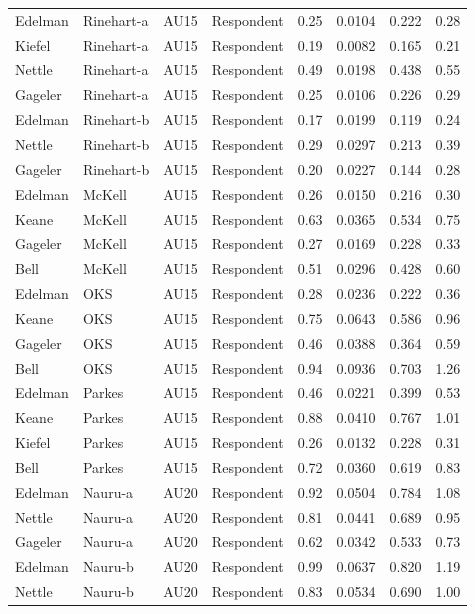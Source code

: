 \documentclass{monashthesis}
\begin{document}
\begin{center}
\begin{longtable}{llllllll}
Edelman & Rinehart-a & AU15 & Respondent & 0.25 & 0.0104 & 0.222 & 0.28 \\
Kiefel & Rinehart-a & AU15 & Respondent & 0.19 & 0.0082 & 0.165 & 0.21 \\
Nettle & Rinehart-a & AU15 & Respondent & 0.49 & 0.0198 & 0.438 & 0.55 \\
Gageler & Rinehart-a & AU15 & Respondent & 0.25 & 0.0106 & 0.226 & 0.29 \\
Edelman & Rinehart-b & AU15 & Respondent & 0.17 & 0.0199 & 0.119 & 0.24 \\
Nettle & Rinehart-b & AU15 & Respondent & 0.29 & 0.0297 & 0.213 & 0.39 \\
Gageler & Rinehart-b & AU15 & Respondent & 0.20 & 0.0227 & 0.144 & 0.28 \\
Edelman & McKell & AU15 & Respondent & 0.26 & 0.0150 & 0.216 & 0.30 \\
Keane & McKell & AU15 & Respondent & 0.63 & 0.0365 & 0.534 & 0.75 \\
Gageler & McKell & AU15 & Respondent & 0.27 & 0.0169 & 0.228 & 0.33 \\
Bell & McKell & AU15 & Respondent & 0.51 & 0.0296 & 0.428 & 0.60 \\
Edelman & OKS & AU15 & Respondent & 0.28 & 0.0236 & 0.222 & 0.36 \\
Keane & OKS & AU15 & Respondent & 0.75 & 0.0643 & 0.586 & 0.96 \\
Gageler & OKS & AU15 & Respondent & 0.46 & 0.0388 & 0.364 & 0.59 \\
Bell & OKS & AU15 & Respondent & 0.94 & 0.0936 & 0.703 & 1.26 \\
Edelman & Parkes & AU15 & Respondent & 0.46 & 0.0221 & 0.399 & 0.53 \\
Keane & Parkes & AU15 & Respondent & 0.88 & 0.0410 & 0.767 & 1.01 \\
Kiefel & Parkes & AU15 & Respondent & 0.26 & 0.0132 & 0.228 & 0.31 \\
Bell & Parkes & AU15 & Respondent & 0.72 & 0.0360 & 0.619 & 0.83 \\
Edelman & Nauru-a & AU20 & Respondent & 0.92 & 0.0504 & 0.784 & 1.08 \\
Nettle & Nauru-a & AU20 & Respondent & 0.81 & 0.0441 & 0.689 & 0.95 \\
Gageler & Nauru-a & AU20 & Respondent & 0.62 & 0.0342 & 0.533 & 0.73 \\
Edelman & Nauru-b & AU20 & Respondent & 0.99 & 0.0637 & 0.820 & 1.19 \\
Nettle & Nauru-b & AU20 & Respondent & 0.83 & 0.0534 & 0.690 & 1.00 \\

\end{longtable}
\end{center}
\end{document}
